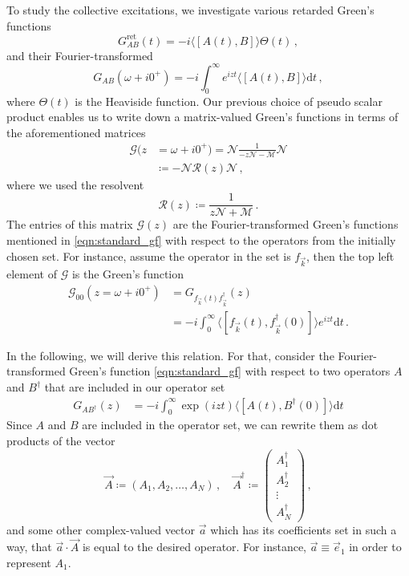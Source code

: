 \documentclass[
    reprint, 
    aps,
    preprintnumbers,
    twocolumn,
    prb,
    superscriptaddress
]{revtex4-2}
\newcommand{\vk}{\vec{k}}
\newcommand{\mM}{\mathcal{M}}
\newcommand{\mN}{\mathcal{N}}
\begin{document}
To study the collective excitations, we investigate various retarded Green's functions 
\begin{equation}
    G_{AB}^\text{ret} (t) = - i \langle [A(t), B] \rangle \Theta(t)\,,
\end{equation}
and their Fourier-transformed
\begin{equation}
    \label{eqn:standard_gf}
    G_{AB}(\omega + i0^+) = -i \int_0^{\infty} e^{izt} \langle [A(t), B] \rangle \mathrm{d}t\,,
\end{equation}
where $\Theta(t)$ is the Heaviside function.
Our previous choice of pseudo scalar product enables us to write down a matrix-valued Green's functions in terms of the aforementioned matrices
\begin{align}
    \label{eqn:green_function}
    \mathcal{G}(z &= \omega + i0^+) = \mN \frac{1}{-z \mN - \mM} \mN \\
        &\coloneqq  -\mN \mathcal{R}(z) \mN\,,
\end{align}
where we used the resolvent
\begin{equation}
    \label{eqn:resolvent}
    \mathcal{R}(z) \coloneqq  \frac{1}{z \mN + \mM}\,.
\end{equation}
The entries of this matrix $\mathcal{G}(z)$ are the Fourier-transformed Green's functions mentioned in \eqref{eqn:standard_gf} with respect to the operators from the initially chosen set.
For instance, assume the operator in the set is $f_{\vk}$, then the top left element of $\mathcal{G}$ is the Green's function 
\begin{align}
    \mathcal{G}_{00}(z = \omega +i0^+) &=  G_{f_{\vk}(t) f_{\vk}^\dagger} (z) \nonumber \\
        &= -i \int_0^{\infty} \langle [f_{\vk}(t), f_{\vk}^\dagger(0)] \rangle e^{izt} \mathrm{d}t\,.
\end{align}

In the following, we will derive this relation.
For that, consider the Fourier-transformed Green's function \eqref{eqn:standard_gf} with respect to two operators $A$ and $B^\dagger$ that are included in our operator set
\begin{align}
    G_{AB^\dagger} (z) &= - i \int_0^\infty \exp(i z t) \langle [ A(t), B^\dagger(0) ] \rangle \mathrm{d}t
\end{align}
Since $A$ and $B$ are included in the operator set, we can rewrite them as dot products of the vector
\begin{equation}
    \vec{A} \coloneqq  \left( A_1, A_2, \dots, A_N \right)\,, \quad
    \vec{A}^\dagger \coloneqq  \begin{pmatrix}
        A_1^\dagger \\ A_2^\dagger \\ \vdots \\ A_N^\dagger
    \end{pmatrix}\,,
\end{equation}
and some other complex-valued vector $\vec{a}$ which has its coefficients set in such a way,
that $\vec{a} \cdot \vec{A}$ is equal to the desired operator. 
For instance, $\vec{a} \equiv \vec{e}_1$ in order to represent $A_1$.
\end{document}
